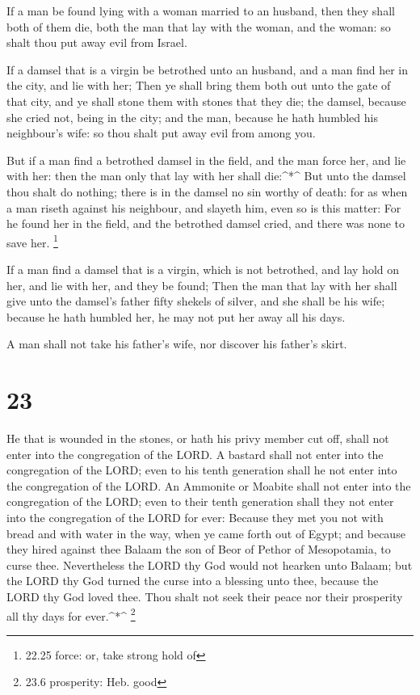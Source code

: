  If a man be found lying with a woman married to an
husband, then they shall both of them die, both the man that lay with
the woman, and the woman: so shalt thou put away evil from Israel.

 If a damsel that is a virgin be betrothed unto an husband,
and a man find her in the city, and lie with her;  Then ye
shall bring them both out unto the gate of that city, and ye shall stone
them with stones that they die; the damsel, because she cried not, being
in the city; and the man, because he hath humbled his neighbour's wife:
so thou shalt put away evil from among you.

 But if a man find a betrothed damsel in the field, and the
man force her, and lie with her: then the man only that lay with her
shall die:\^{}*\^{}  But unto the damsel thou shalt do
nothing; there is in the damsel no sin worthy of death: for as when a
man riseth against his neighbour, and slayeth him, even so is this
matter:  For he found her in the field, and the betrothed
damsel cried, and there was none to save her. \footnote{22.25 force: or,
  take strong hold of}

 If a man find a damsel that is a virgin, which is not
betrothed, and lay hold on her, and lie with her, and they be found;
 Then the man that lay with her shall give unto the
damsel's father fifty shekels of silver, and she shall be his wife;
because he hath humbled her, he may not put her away all his days.

 A man shall not take his father's wife, nor discover his
father's skirt.

\hypertarget{section-22}{%
\section{23}\label{section-22}}

 He that is wounded in the stones, or hath his privy member
cut off, shall not enter into the congregation of the LORD. 
A bastard shall not enter into the congregation of the LORD; even to his
tenth generation shall he not enter into the congregation of the LORD.
 An Ammonite or Moabite shall not enter into the
congregation of the LORD; even to their tenth generation shall they not
enter into the congregation of the LORD for ever:  Because
they met you not with bread and with water in the way, when ye came
forth out of Egypt; and because they hired against thee Balaam the son
of Beor of Pethor of Mesopotamia, to curse thee. 
Nevertheless the LORD thy God would not hearken unto Balaam; but the
LORD thy God turned the curse into a blessing unto thee, because the
LORD thy God loved thee.  Thou shalt not seek their peace
nor their prosperity all thy days for ever.\^{}*\^{} \footnote{23.6
  prosperity: Heb. good}

